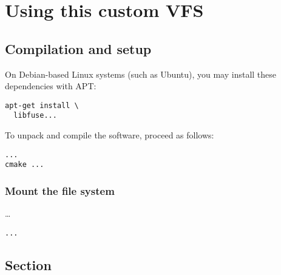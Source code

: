 \chapter{Using this custom VFS}

\section*{Compilation and setup}

On Debian-based Linux systems (such as Ubuntu), you may install these dependencies with APT:

\begin{Verbatim}
apt-get install \
  libfuse...
\end{Verbatim}

To unpack and compile the software, proceed as follows:

\begin{Verbatim}
...
cmake ...
\end{Verbatim}

\subsection*{Mount the file system}

\ldots

\begin{Verbatim}
...
\end{Verbatim}

\section*{Section}